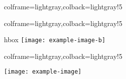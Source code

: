 \documentclass[11pt,a4paper]{ltxdoc}
\begin{document}
\begin{tcblisting}{colframe=lightgray,colback=lightgray!5}
\begin{PDFViewer}[Width=14cm,Icons=false]{}
\end{PDFViewer}
\end{tcblisting}

\begin{tcblisting}{colframe=lightgray,colback=lightgray!5}
\begin{IMGViewer}[Icons=false]{hbox}
\texttt{[image: example-image-b]}
\end{IMGViewer}
\end{tcblisting}

\begin{tcblisting}{colframe=lightgray,colback=lightgray!5}
\begin{IMGViewer}[Width=12cm]{}
\texttt{[image: example-image]}
\end{IMGViewer}
\end{tcblisting}
\end{document}
